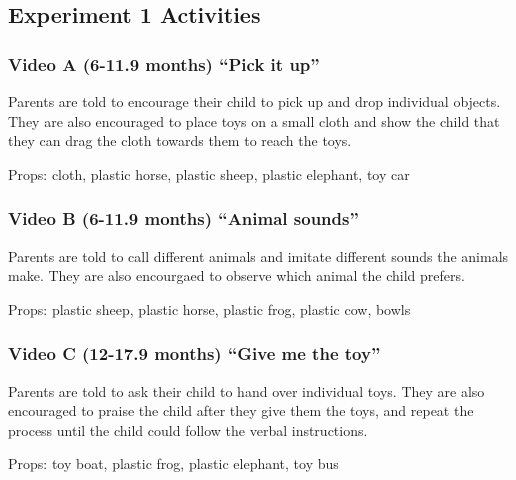 \documentclass[man,floatsintext]{apa6}
\begin{document}
\begin{appendix}
\section{}
\hypertarget{experiment-1-activities}{%
\subsection{Experiment 1 Activities}\label{experiment-1-activities}}

\hypertarget{video-a-6-11.9-months-pick-it-up}{%
\subsubsection{Video A (6-11.9 months) ``Pick it
up''}\label{video-a-6-11.9-months-pick-it-up}}

Parents are told to encourage their child to pick up and drop individual
objects. They are also encouraged to place toys on a small cloth and
show the child that they can drag the cloth towards them to reach the
toys.

Props: cloth, plastic horse, plastic sheep, plastic elephant, toy car

\hypertarget{video-b-6-11.9-months-animal-sounds}{%
\subsubsection{Video B (6-11.9 months) ``Animal
sounds''}\label{video-b-6-11.9-months-animal-sounds}}

Parents are told to call different animals and imitate different sounds
the animals make. They are also encourgaed to observe which animal the
child prefers.

Props: plastic sheep, plastic horse, plastic frog, plastic cow, bowls

\hypertarget{video-c-12-17.9-months-give-me-the-toy}{%
\subsubsection{Video C (12-17.9 months) ``Give me the
toy''}\label{video-c-12-17.9-months-give-me-the-toy}}

Parents are told to ask their child to hand over individual toys. They
are also encouraged to praise the child after they give them the toys,
and repeat the process until the child could follow the verbal
instructions.

Props: toy boat, plastic frog, plastic elephant, toy bus


\end{appendix}
\end{document}
